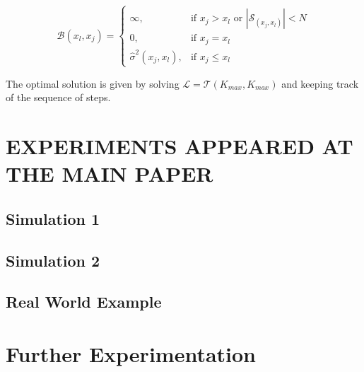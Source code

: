 \documentclass[twoside]{article}
\begin{document}
\begin{equation}
  \label{eq:cost_step}
  \mathcal{B}(x_l, x_j) = \begin{cases}
                            \infty, & \text{if $x_j > x_l$ or \(|\mathcal{S}_{(x_j, x_l)}| < N\)}\\
                            0, & \text{if $x_j = x_l$}\\
                            \hat{\sigma}^2(x_j, x_l), &\text{if $x_j \leq x_l$}
  \end{cases}
\end{equation}

The optimal solution is given by solving
\(\mathcal{L} = \mathcal{T}(K_{max}, K_{max})\) and keeping track of the sequence of
steps.


\section{EXPERIMENTS APPEARED AT THE MAIN PAPER}

\subsection{Simulation 1}

\subsection{Simulation 2}

\subsection{Real World Example}

\section{Further Experimentation}





\end{document}
